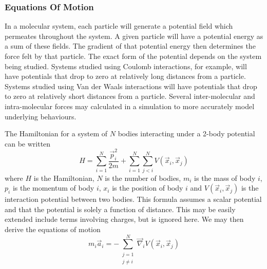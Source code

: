 \subsubsection{Equations Of Motion}

%
In a molecular system, each particle will generate a potential field
which permeates throughout the system.
%
A given particle will have a potential energy as a sum of these fields.
%
The gradient of that potential energy then determines
the force felt by that particle.
%
The exact form of the potential depends on the system being studied.
%
Systems studied using Coulomb interactions, for example,
will have potentials that drop to zero at relatively long distances
from a particle.
%
Systems studied using Van der Waals interactions will have
potentials that drop to zero at relatively short distances from
a particle.
%
Several inter-molecular and intra-molecular forces may
calculated in a simulation to more accurately model underlying behaviours.


%
The Hamiltonian for a system of $N$ bodies
interacting under a 2-body potential can be written
\begin{equation}
    H = \sum_{i=1}^N \frac{\vec{p}_i^2}{2 m}
        + \sum_{i=1}^N \sum_{j<i}^N V(\vec{x}_i, \vec{x}_j)
\end  {equation}
where $H$ is the Hamiltonian,
$N$ is the number of bodies,
$m_i$ is the mass of body $i$,
$p_i$ is the momentum of body $i$,
$x_i$ is the position of body $i$ and
$V(\vec{x}_i, \vec{x}_j)$ is the interaction potential between two bodies.
This formula assumes a scalar potential and
that the potential is solely a function of distance.
%
This may be easily extended include terms involving charges,
but is ignored here.
%
We may then derive the equations of motion
\begin{equation}
    m_i \vec{a}_i = -\sum_{\substack{j=1\\j\ne{}i}}^N
                    \vec{\nabla}_i V(\vec{x}_i, \vec{x}_j)
\end  {equation}


